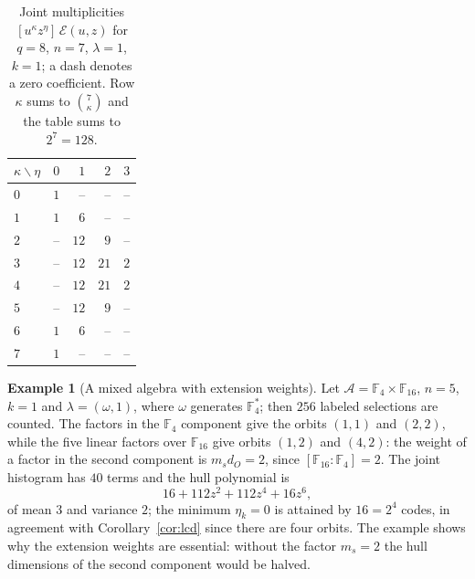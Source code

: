 \documentclass[10pt,a4paper]{article}
\newcommand{\F}{\mathbb F}
\newcommand{\A}{\mathcal A}
\newcommand{\Epoly}{\mathscr E}
\numberwithin{equation}{section}
\theoremstyle{plain}
\theoremstyle{definition}
\newtheorem{example}[theorem]{Example}
\theoremstyle{remark}
\begin{document}
\begin{table}[ht]
\centering
\caption{Joint multiplicities $[u^{\kappa}z^{\eta}]\,\Epoly(u,z)$ for $q=8$,
$n=7$, $\lambda=1$, $k=1$; a dash denotes a zero coefficient. Row $\kappa$ sums
to $\binom{7}{\kappa}$ and the table sums to $2^7=128$.}
\label{tab:F8}
\small
\begin{tabular}{@{}lrrrr@{}}
\toprule
$\kappa\backslash\eta$ & $0$ & $1$ & $2$ & $3$ \\
\midrule
$0$ & $1$ & -- & -- & -- \\
$1$ & $1$ & $6$ & -- & -- \\
$2$ & -- & $12$ & $9$ & -- \\
$3$ & -- & $12$ & $21$ & $2$ \\
$4$ & -- & $12$ & $21$ & $2$ \\
$5$ & -- & $12$ & $9$ & -- \\
$6$ & $1$ & $6$ & -- & -- \\
$7$ & $1$ & -- & -- & -- \\
\bottomrule
\end{tabular}
\end{table}

\begin{example}[A mixed algebra with extension weights]\label{ex:mixed}
Let $\A=\F_4\times\F_{16}$, $n=5$, $k=1$ and $\lambda=(\omega,1)$, where $\omega$
generates $\F_4^*$; then $256$ labeled selections are counted. The factors in
the $\F_4$ component give the orbits $(1,1)$ and $(2,2)$, while the five linear
factors over $\F_{16}$ give orbits $(1,2)$ and $(4,2)$: the weight of a factor in
the second component is $m_sd_O=2$, since $[\F_{16}:\F_4]=2$. The joint histogram
has $40$ terms and the hull polynomial is
\[
16+112z^2+112z^4+16z^6,
\]
of mean $3$ and variance $2$; the minimum $\eta_k=0$ is attained by $16=2^4$
codes, in agreement with Corollary~\ref{cor:lcd} since there are four orbits. The
example shows why the extension weights are essential: without the factor
$m_s=2$ the hull dimensions of the second component would be halved.
\end{example}
\end{document}
